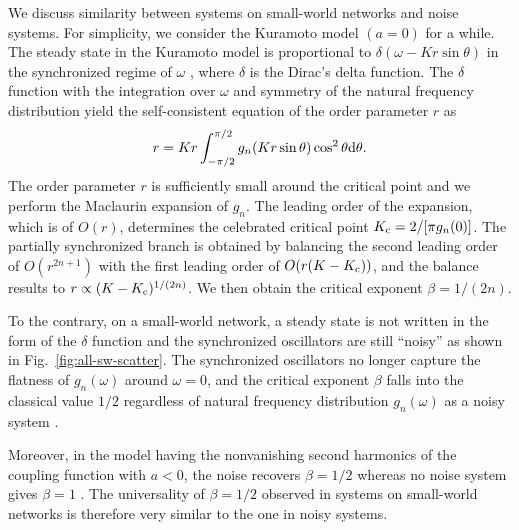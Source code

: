 We discuss similarity between systems on small-world networks
and noise systems.
For simplicity, we consider the Kuramoto model $(a=0)$ for a while.
The steady state in the Kuramoto model is
proportional to $\delta(\omega-Kr\sin\theta)$
in the synchronized regime
of $\omega$ \cite{strogatz2000,fonseca2018},
where $\delta$ is the Dirac's delta function.
The $\delta$ function with the integration over $\omega$
and symmetry of the natural frequency distribution
yield the self-consistent equation of the order parameter $r$ as
\begin{align}
  r=Kr\int_{-\pi/2}^{\pi/2}g_{n}(Kr\sin\theta)\cos^{2}\theta\mathrm{d}\theta.
  \label{eq:self-consistent}
\end{align}
The order parameter $r$ is sufficiently small around the critical point
and we perform the Maclaurin expansion of $g_{n}$.
The leading order of the expansion, which is of $O(r)$,
determines the celebrated critical point $K_{\rm c}=2/[\pi g_{n}(0)]$.
The partially synchronized branch is obtained
by balancing the second leading order of $O(r^{2n+1})$
with the first leading order of $O(r(K-K_{\rm c}))$,
and the balance results to $r\propto (K-K_{\rm c})^{1/(2n)}$.
We then obtain the critical exponent $\beta=1/(2n)$.

To the contrary, on a small-world network,
a steady state is not written in the form of the $\delta$ function
and the synchronized oscillators are still ``noisy''
as shown in Fig.~\ref{fig:all-sw-scatter}.
The synchronized oscillators no longer capture
the flatness of $g_{n}(\omega)$ around $\omega=0$,
and the critical exponent $\beta$ falls into the classical value $1/2$
regardless of natural frequency distribution $g_{n}(\omega)$
as a noisy system \cite{sakaguchi1988}.

Moreover, in the model having the nonvanishing second harmonics
of the coupling function with $a<0$,
the noise recovers $\beta=1/2$ \cite{crawford1995}
whereas no noise system gives $\beta=1$ \cite{daido1994}.
The universality of $\beta=1/2$ observed in systems on small-world networks
is therefore very similar to the one in noisy systems.


